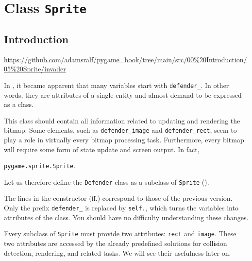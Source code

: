 \newpage
\section{Class \texttt{Sprite}}\label{secSprite}

\subsection{Introduction}
\begin{diskbox}
	\url{https://github.com/adamsralf/pygame_book/tree/main/src/00%20Introduction/05%20Sprite/invader}
\end{diskbox}

In , it became apparent that many variables start with \texttt{defender\_}. In other words, they are attributes of a single entity and almost demand to be expressed as a class.

This class should contain all information related to updating and rendering the bitmap. Some elements, such as \texttt{defender\_image} and \texttt{defender\_rect}, seem to play a role in virtually every bitmap processing task. Furthermore, every bitmap will require some form of state update and screen output. In fact, 

\begin{hintbox}
	\texttt{pygame.sprite.Sprite}.
\end{hintbox}

Let us therefore define the \texttt{Defender} class as a subclass of \texttt{Sprite} ().


The lines in the constructor (ff.) correspond to those of the previous version. Only the prefix \texttt{defender\_} is replaced by \texttt{self.}, which turns the variables into attributes of the class. You should have no difficulty understanding these changes.

Every subclass of \texttt{Sprite} must provide two attributes: \texttt{rect} and \texttt{image}. These two attributes are accessed by the already predefined solutions for collision detection, rendering, and related tasks. We will see their usefulness later on.

